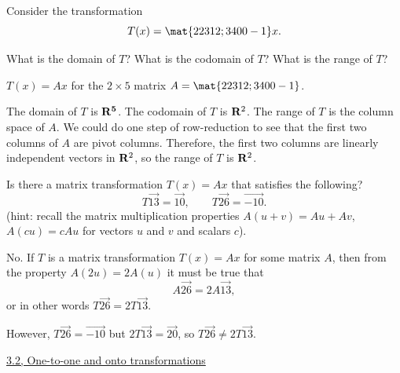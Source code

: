 \begin{problems}
\problem Consider the transformation
\[T(x) = \mat{2 2 3 1 2; 3 4 0 0 -1}x.\]
\begin{subproblems}
  \subproblem What is the domain of $T$?
  \subproblem What is the codomain of $T$?
  \subproblem What is the range of $T$?
\end{subproblems}

\begin{solution} $T(x) = Ax$ for the $2 \times 5$ matrix
  $A = \mat{2 2 3 1 2; 3 4 0 0 -1}$.
  \begin{subproblems}
    \subproblem The domain of $T$ is ${\bf R^5}$.  %
    \subproblem The codomain of $T$ is ${\bf R}^2$. %
    \subproblem The range of $T$ is the column space of $A$. We could
    do one step of row-reduction to see that the first two columns of
    $A$ are pivot columns.  Therefore, the first two columns are
    linearly independent vectors in ${\bf R}^2$, so the range of $T$
    is ${\bf R}^2$.
  \end{subproblems}
\end{solution}



\problem Is there a matrix transformation $T(x) = Ax$ that satisfies
the following?
\[T\vec{1 3} = \vec{1 0}, \qquad T \vec{2 6} = \vec{-1 0}.\] (hint:
recall the matrix multiplication properties $A(u+v) = Au+Av$,
$A(cu) = cAu$ for vectors $u$ and $v$ and scalars $c$).

\begin{solution}
  No.  If $T$ is a matrix transformation $T(x) = Ax$ for some matrix
  $A$, then from the property $A(2u) = 2 A(u)$ it must be true that
  \[A \vec{2 6} = 2 A \vec{1 3},\] or in other words
  $T \vec{2 6} = 2 T\vec{1 3}$.

  However, $T\vec{2 6} = \vec{-1 0}$ but $2 T \vec{1 3} = \vec{2 0}$,
  so $T \vec{2 6} \neq 2 T\vec{1 3}$.
\end{solution}

\end{problems}\setcounter{problem}{0}

\newpage

\begin{center} \underline{3.2, One-to-one and onto
    transformations} \end{center}

